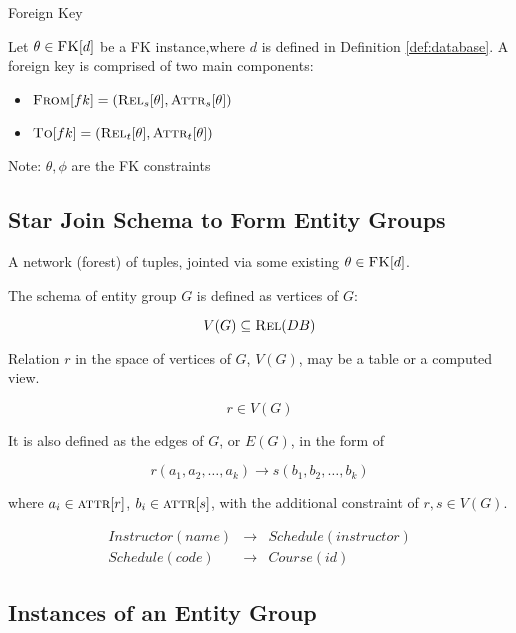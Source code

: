 		\begin{defn}{Foreign Key}
		
			Let $\theta \in \textsc{FK}\lbrack d\rbrack$ be a FK instance,where $d$ is defined in Definition \ref{def:database}.  A foreign key is comprised of two main components:
			
			\begin{itemize}
				\item $\textsc{From}\lbrack fk\rbrack = (\textsc{Rel}_{s}\lbrack\theta\rbrack, \textsc{Attr}_{s}\lbrack\theta\rbrack)$
				\item $\textsc{To}\lbrack fk\rbrack = (\textsc{Rel}_{t}\lbrack\theta\rbrack, \textsc{Attr}_{t}\lbrack\theta\rbrack)$
			\end{itemize}
			
			Note:  $\theta, \phi$ are the FK constraints
		\end{defn}
	
	\subsection{Star Join Schema to Form Entity Groups}
		A network (forest) of tuples, jointed via some existing $\theta \in \textsc{FK}\lbrack d\rbrack$.
		
		The schema of entity group $G$ is defined as vertices of $G$:
		
		$$V(G) \subseteq \textsc{Rel}(DB)$$
		
		Relation $r$ in the space of vertices of $G$, $V(G)$, may be a table or a computed view.
		
		$$r \in V(G)$$
		
		It is also defined as the edges of $G$, or $E(G)$, in the form of
		
		$$r(a_1, a_2, \ldots, a_k) \rightarrow s(b_1, b_2, \ldots, b_k)$$
		
		where $a_i \in \textsc{attr}\lbrack r\rbrack$, $b_i \in \textsc{attr}\lbrack s\rbrack$, with the additional constraint of $r, s \in V(G)$.
		
		\begin{ex}
			\begin{eqnarray*}
				Instructor(name) &\rightarrow& Schedule(instructor) \\
				Schedule(code) &\rightarrow& Course(id)
			\end{eqnarray*}
		\end{ex}
	
	\subsection{Instances of an Entity Group}
		
